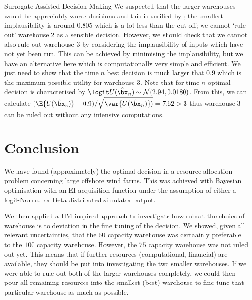 \begin{chapter}{Surrogate Assisted Decision Making \label{Chap:optimisation}}
We suspected that the larger warehouses would be appreciably worse decisions and this is verified by ; the smallest implausibility is around $0.805$ which is a lot less than the cut-off; we cannot `rule out' warehouse $2$ as a sensible decision. However, we should check that we cannot also rule out warehouse $3$ by considering the implausibility of inputs which have not yet been run. This can be achieved by minimising the implausibility, but we have an alternative here which is computationally very simple and efficient. We just need to show that the time $n$ best decision is much larger that $0.9$ which is the maximum possible utility for warehouse $3$. Note that for time $n$ optimal decision is characterised by $\logit U(\hat{\bx}_n) \sim \mathcal{N}(2.94, 0.0180)$. From this, we can calculate $(\E \{ U( \hat{\bx}_n ) \} - 0.9 )/ \sqrt{ \var \{ U( \hat{\bx}_n) \} ) } = 7.62 > 3$ thus warehouse $3$ can be ruled out without any intensive computations.





\section{Conclusion}

We have found (approximately) the optimal decision in a resource allocation problem concerning large offshore wind farms. This was achieved with Bayesian optimisation with an EI acquisition function under the assumption of either a logit-Normal or Beta distributed simulator output.

We then applied a HM inspired approach to investigate how robust the choice of warehouse is to deviation in the fine tuning of the decision. We showed, given all relevant uncertainties, that the $50$ capacity warehouse was certaainly preferable to the $100$ capacity warehouse. However, the $75$ capacity warehouse was not ruled out yet. This means that if further resources (computational, financial) are available, they should be put into investigating the two smaller warehouses. If we were able to rule out both of the larger warehouses completely, we could then pour all remaining resources into the smallest (best) warehouse to fine tune that particular warehouse as much as possible.

\end{chapter}
